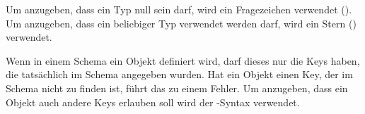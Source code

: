 Um anzugeben, dass ein Typ null sein darf, wird ein Fragezeichen verwendet ().
Um anzugeben, dass ein beliebiger Typ verwendet werden darf, wird ein Stern (\inlineOnj{*}) verwendet.

Wenn in einem Schema ein Objekt definiert wird, darf dieses nur die Keys haben, die tatsächlich im Schema angegeben
wurden.
Hat ein Objekt einen Key, der im Schema nicht zu finden ist, führt das zu einem Fehler.
Um anzugeben, dass ein Objekt auch andere Keys erlauben soll wird der -Syntax verwendet.

\renewcommand{\kapitelautor}{}
